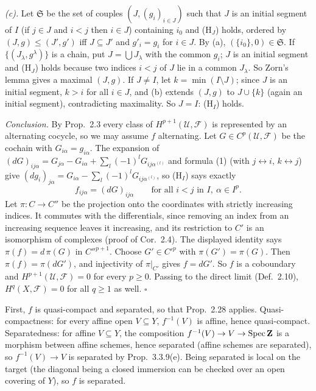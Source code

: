 \documentclass[11pt]{article}
\begin{document}
\emph{(c).} Let $\mathfrak S$ be the set of couples $(J,(g_i)_{i\in J})$ such that $J$ is an initial segment of $I$ (if $j\in J$ and $i<j$ then $i\in J$) containing $i_0$ and (H$_J$) holds, ordered by $(J,g)\le(J',g')$ iff $J\subseteq J'$ and $g'_i=g_i$ for $i\in J$. By (a), $(\{i_0\},0)\in\mathfrak S$. If $\{(J_\lambda,g^\lambda)\}$ is a chain, put $J=\bigcup J_\lambda$ with the common $g_i$; $J$ is an initial segment and (H$_J$) holds because two indices $i<j$ of $J$ lie in a common $J_\lambda$. So Zorn's lemma gives a maximal $(J,g)$. If $J\ne I$, let $k=\min(I\setminus J)$; since $J$ is an initial segment, $k>i$ for all $i\in J$, and (b) extends $(J,g)$ to $J\cup\{k\}$ (again an initial segment), contradicting maximality. So $J=I$: (H$_I$) holds.

\emph{Conclusion.} By Prop.~2.3 every class of $H^{p+1}(\mathcal U,\mathcal F)$ is represented by an alternating cocycle, so we may assume $f$ alternating. Let $G\in C^p(\mathcal U,\mathcal F)$ be the cochain with $G_{i\alpha}=g_{i\alpha}$. The expansion of $(dG)_{ij\alpha}=G_{j\alpha}-G_{i\alpha}+\sum_l(-1)^lG_{ij\alpha^{(l)}}$ and formula (1) (with $j\leftrightarrow i$, $k\leftrightarrow j$) give $(dg_i)_{j\alpha}=G_{i\alpha}-\sum_l(-1)^lG_{ij\alpha^{(l)}}$, so (H$_I$) says exactly
\[ f_{ij\alpha}=(dG)_{ij\alpha}\qquad\text{for all }i<j\text{ in }I,\ \alpha\in I^p. \]
Let $\pi:C\to C''$ be the projection onto the coordinates with strictly increasing indices. It commutes with the differentials, since removing an index from an increasing sequence leaves it increasing, and its restriction to $C'$ is an isomorphism of complexes (proof of Cor.~2.4). The displayed identity says $\pi(f)=d\,\pi(G)$ in $C''^{p+1}$. Choose $G'\in C'^p$ with $\pi(G')=\pi(G)$. Then $\pi(f)=\pi(dG')$, and injectivity of $\pi|_{C'}$ gives $f=dG'$. So $f$ is a coboundary and $H^{p+1}(\mathcal U,\mathcal F)=0$ for every $p\ge0$. Passing to the direct limit (Def.~2.10), $H^q(X,\mathcal F)=0$ for all $q\ge1$ as well. \hfill$\square$

\pf
First, $f$ is quasi-compact and separated, so that Prop.~2.28 applies. Quasi-compactness: for every affine open $V\subseteq Y$, $f^{-1}(V)$ is affine, hence quasi-compact. Separatedness: for affine $V\subseteq Y$, the composition $f^{-1}(V)\to V\to\operatorname{Spec}\mathbf Z$ is a morphism between affine schemes, hence separated (affine schemes are separated), so $f^{-1}(V)\to V$ is separated by Prop.~3.3.9(e). Being separated is local on the target (the diagonal being a closed immersion can be checked over an open covering of $Y$), so $f$ is separated.
\end{document}
